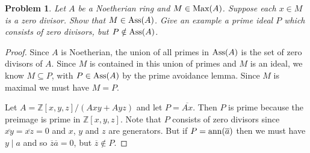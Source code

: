\documentclass{article}
\newcommand{\ass}{\textup{Ass}}
\newcommand{\ann}{\textup{ann}}
\newcommand{\Max}{\textup{Max}}
\newtheorem{problem}{Problem}
\begin{document}
\begin{problem}
Let $A$ be a Noetherian ring and $M \in \Max(A)$. Suppose each $x \in M$ is a zero divisor. Show that $M \in \ass(A)$. Give an example a prime ideal $P$ which consists of zero divisors, but $P \notin \ass(A)$.
\end{problem}
\begin{proof}
Since $A$ is Noetherian, the union of all primes in $\ass(A)$ is the set of zero divisors of $A$. Since $M$ is contained in this union of primes and $M$ is an ideal, we know $M \subseteq P$, with $P \in \ass(A)$ by the prime avoidance lemma. Since $M$ is maximal we must have $M = P$.

Let $A = \mathbb{Z}[x,y,z]/(Axy + Ayz)$ and let $P = \overline{Ax}$. Then $P$ is prime because the preimage is prime in $\mathbb{Z}[x,y,z]$. Note that $P$ consists of zero divisors since $\overline{xy} = \overline{xz} = 0$ and $x$, $y$ and $z$ are generators. But if $P = \ann(\overline{a})$ then we must have $y \mid a$ and so $\overline{z} \overline{a} = 0$, but $\overline{z} \notin P$.
\end{proof}
\end{document}
